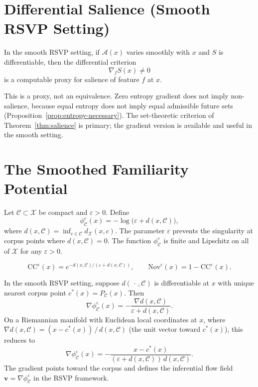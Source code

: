 \documentclass[12pt, a4paper, oneside]{book}
\newcommand{\Adm}{\mathcal{A}}
\newcommand{\X}{\mathcal{X}}
\newcommand{\C}{\mathcal{C}}
\newcommand{\Nov}{\mathrm{Nov}}
\newcommand{\CC}{\mathrm{CC}}
\newcommand{\Ent}{S}
\newcommand{\phiCe}{\phi_{\C}^{\varepsilon}}
\newcommand{\vel}{\mathbf{v}}
\begin{document}
\section{Differential Salience (Smooth RSVP Setting)}

\begin{proposition}
\label{prop:entropy-grad}
In the smooth RSVP setting, if $\Adm(x)$ varies smoothly with $x$ and
$\Ent$ is differentiable, then the differential criterion
\[
  \nabla_f \Ent(x) \neq 0
\]
is a computable proxy for salience of feature $f$ at $x$.
\end{proposition}

\begin{remark}
This is a proxy, not an equivalence. Zero entropy gradient does not imply
non-salience, because equal entropy does not imply equal admissible future
sets (Proposition~\ref{prop:entropy-necessary}). The set-theoretic
criterion of Theorem~\ref{thm:salience} is primary; the gradient version
is available and useful in the smooth setting.
\end{remark}

\section{The Smoothed Familiarity Potential}

\begin{definition}
\label{def:familiarity}
Let $\C \subset \X$ be compact and $\varepsilon > 0$. Define
\[
  \phiCe(x) = -\log\bigl(\varepsilon + d(x,\C)\bigr),
\]
where $d(x,\C) = \inf_{c \in \C} d_\X(x,c)$. The parameter $\varepsilon$
prevents the singularity at corpus points where $d(x,\C) = 0$.
The function $\phiCe$ is finite and Lipschitz on all of $\X$ for any
$\varepsilon > 0$.
\end{definition}

\begin{definition}
\label{def:corpus-formal}
\[
  \CC^\varepsilon(x) = e^{-d(x,\C)/(\varepsilon + d(x,\C))},
  \qquad
  \Nov^\varepsilon(x) = 1 - \CC^\varepsilon(x).
\]
\end{definition}

\begin{proposition}
\label{prop:gradient}
In the smooth RSVP setting, suppose $d(\,\cdot\,,\C)$ is differentiable
at $x$ with unique nearest corpus point $c^*(x) = P_\C(x)$. Then
\[
  \nabla \phiCe(x)
  = -\frac{\nabla d(x,\C)}{\varepsilon + d(x,\C)}.
\]
On a Riemannian manifold with Euclidean local coordinates at $x$, where
$\nabla d(x,\C) = (x - c^*(x))\,/\,d(x,\C)$ (the unit vector toward
$c^*(x)$), this reduces to
\[
  \nabla \phiCe(x)
  = -\frac{x - c^*(x)}{(\varepsilon + d(x,\C))\,d(x,\C)}.
\]
The gradient points toward the corpus and defines the inferential flow
field $\vel = \nabla \phiCe$ in the RSVP framework.
\end{proposition}
\end{document}
